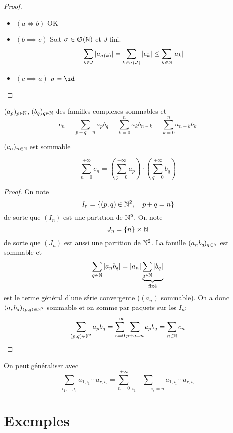 \begin{proof}~
    \begin{itemize}
        \item $(a\iff b)$ OK
        \item $(b\implies c)$ Soit $\sigma\in\mathfrak S(\mathbb N)$ et $J$ fini. \[
                \sum_{k\in J}|a_{\sigma(k)}|=\sum_{k\in\sigma(J)}|a_k|\leq \sum_{k\in\mathbb N}|a_k|
            \]
        \item $(c\implies a)$ $\sigma=\id$
    \end{itemize}
\end{proof}

\begin{thm}
    \Hyp $(a_p)_{p\in\mathbb N}$, $(b_q)_{q\in\mathbb N}$ des familles complexes sommables et \[
        c_n=\sum_{p+q=n}a_pb_q=\sum_{k=0}^na_kb_{n-k}=\sum_{k=0}^na_{n-k}b_k
    \]
    \begin{concenum}
    \item $(c_n)_{n\in\mathbb N}$ est sommable
    \item \[
            \sum_{n=0}^{+\infty}c_n= \left( \sum_{p=0}^{+\infty} a_p \right)\cdot \left( \sum_{q=0}^{+\infty}b_q \right)
        \]
    \end{concenum}
\end{thm}

\begin{proof}
    On note \[
        I_n=\{(p, q)\in\mathbb N^2, \quad p+q=n\}
    \]
    de sorte que $(I_n)$ est une partition de $\mathbb N^2$. On note \[
        J_n=\{n\}\times \mathbb N
    \]
    de sorte que $(J_n)$ est aussi une partition de $\mathbb N^2$. La famille $(a_nb_q)_{q\in\mathbb N}$ est sommable et \[
        \sum_{q\in\mathbb N}|a_nb_q|=|a_n|\underbrace{\sum_{q\in\mathbb N}|b_q|}_{\text{fixé}}
    \]
    est le terme général d'une série convergente ($(a_n)$ sommable).
    On a donc $(a_pb_q)_{(p, q)\in\mathbb N^2}$ sommable et on somme par paquets sur les $I_n$:\[
        \sum_{(p, q)\in\mathbb N^2}a_pb_q=\sum_{n=0}^{+\infty}\sum_{p+q=n}a_pb_q=\sum_{n\in\mathbb N}c_n
    \]
\end{proof}

\begin{rem}
    On peut généraliser avec \[
        \sum_{i_1, \cdots, i_r}a_{1,i_1}\cdots a_{r,i_r}=\sum_{n=0}^{+\infty}\sum_{i_1+\cdots+i_r=n}a_{1,i_1}\cdots a_{r, i_r}
    \]
\end{rem}

\section{Exemples}

